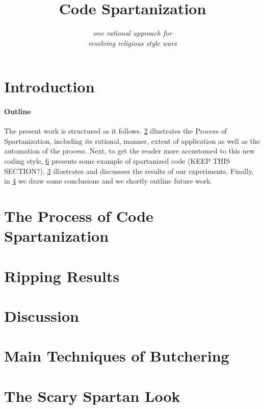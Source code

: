 \documentclass[preprint,10pt,nonatbib]{sigplanconf}
\title{Code Spartanization}
\subtitle{\scriptsize \emph{one rational approach for\\ resolving religious style wars}}
\begin{document}
\maketitle

\def\ignore#1{}
\def\gal{\marginpar[G$\Rightarrow$]{$\Leftarrow$G}}
\def\yossi{\marginpar[Y$\Rightarrow$]{$\Leftarrow$Y}}
\def\matteo{\marginpar[M$\Rightarrow$]{$\Leftarrow$M}}

\begin{abstract}
  
\end{abstract}

\section{Introduction}


\paragraph{Outline}
The present work is structured as it follows.
\cref{section:principia} illustrates the Process of Spartanization, 
including its rational, manner, extent of application as well as
the automation of the process. 
Next, to get the reader more accustomed to this new coding style, 
\cref{section:look} presents some example of spartanized code (KEEP THIS SECTION?).
\cref{section:initial} illustrates and discussses 
the results of our experiments.
Finally, in \cref{section:zz} we draw some conclusions and we shortly
outline future work.

\section{The Process of Code Spartanization}
\label{section:principia}


\section{Ripping Results}
\label{section:initial}


\section{Discussion}
\label{section:zz}


\balance
\small


\eject
\appendix
\section{Main Techniques of Butchering}
\label{section:techniques}


\section{The Scary Spartan Look}
\label{section:look}

\end{document}
